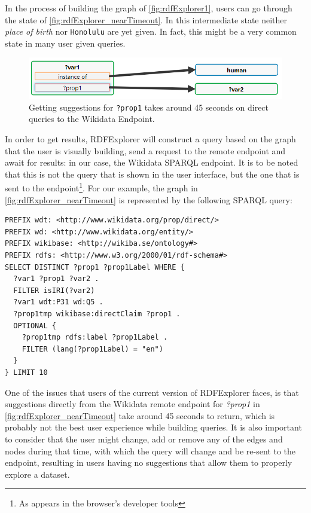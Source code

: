 In the process of building the graph of \autoref{fig:rdfExplorer1}, users can go through the state of \autoref{fig:rdfExplorer_nearTimeout}. 
In this intermediate state neither \textit{place of birth} nor \texttt{Honolulu} are yet given. 
In fact, this might be a very common state in many user given queries. 

\begin{figure}[H]
    \centering
        \includegraphics[width=0.8\linewidth]{imagenes/near timeout query.png}
        \caption{Getting suggestions for \texttt{?prop1} takes around 45 seconds on direct queries to the Wikidata Endpoint.}
        \label{fig:rdfExplorer_nearTimeout}
\end{figure}

In order to get results, RDFExplorer will construct a query based on the graph that the user is visually building, send a request to the remote endpoint and await for results: in our case, the Wikidata SPARQL endpoint. 
It is to be noted that this is not the query that is shown in the user interface, but the one that is sent to the endpoint\footnote{As appears in the browser's developer tools}. 
For our example, the graph in \autoref{fig:rdfExplorer_nearTimeout} is represented by the following SPARQL query:

\begin{verbatim}
PREFIX wdt: <http://www.wikidata.org/prop/direct/>
PREFIX wd: <http://www.wikidata.org/entity/>
PREFIX wikibase: <http://wikiba.se/ontology#>
PREFIX rdfs: <http://www.w3.org/2000/01/rdf-schema#>
SELECT DISTINCT ?prop1 ?prop1Label WHERE {
  ?var1 ?prop1 ?var2 .
  FILTER isIRI(?var2)
  ?var1 wdt:P31 wd:Q5 .
  ?prop1tmp wikibase:directClaim ?prop1 .
  OPTIONAL {
    ?prop1tmp rdfs:label ?prop1Label .
    FILTER (lang(?prop1Label) = "en")
  }
} LIMIT 10
\end{verbatim}

One of the issues that users of the current version of RDFExplorer faces, is that suggestions directly from the Wikidata remote endpoint for \textit{?prop1} in \autoref{fig:rdfExplorer_nearTimeout} take around 45 seconds to return, which is probably not the best user experience while building queries. It is also important to consider that the user might change, add or remove any of the edges and nodes during that time, with which the query will change and be re-sent to the endpoint, resulting in users having no suggestions that allow them to properly explore a dataset. 


